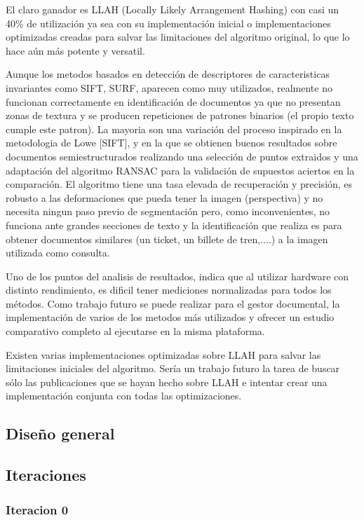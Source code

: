 El claro ganador es LLAH (Locally Likely Arrangement Hashing) con casi un 40\% de utilización ya sea con su implementación inicial o implementaciones optimizadas creadas para salvar las limitaciones del algoritmo original, lo que lo hace aún más potente y versatil.

Aunque los metodos basados en detección de descriptores de caracteristicas invariantes como SIFT, SURF, aparecen como muy utilizados, realmente no funcionan correctamente en identificación de documentos ya que no presentan zonas de textura y se producen repeticiones de patrones binarios (el propio texto cumple este patron). La mayoria son una variación del proceso inspirado en la metodologia de Lowe [SIFT], y en la que se obtienen buenos resultados sobre documentos semiestructurados realizando una selección de puntos extraidos y una adaptación del algoritmo RANSAC para la validación de supuestos aciertos en la comparación. El algoritmo tiene una tasa elevada de recuperación y precisión, es robusto a las deformaciones que pueda tener la imagen (perspectiva) y no necesita ningun paso previo de segmentación pero, como inconvenientes, no funciona ante grandes secciones de texto y la identificación que realiza es para obtener documentos similares (un ticket, un billete de tren,....) a la imagen utilizada como consulta.

Uno de los puntos del analisis de resultados, indica que al utilizar hardware con distinto rendimiento, es dificil tener mediciones normalizadas para todos los métodos. Como trabajo futuro se puede realizar para el gestor documental, la implementación de varios de los metodos más utilizados y ofrecer un estudio comparativo completo al ejecutarse en la misma plataforma.

Existen varias implementaciones optimizadas sobre LLAH para salvar las limitaciones iniciales del algoritmo. Sería un trabajo futuro la tarea de buscar sólo las publicaciones que se hayan hecho sobre LLAH e intentar crear una implementación conjunta  con todas las optimizaciones. 

\subsection{Diseño general}
\subsection{Iteraciones}
\subsubsection{Iteracion 0}

